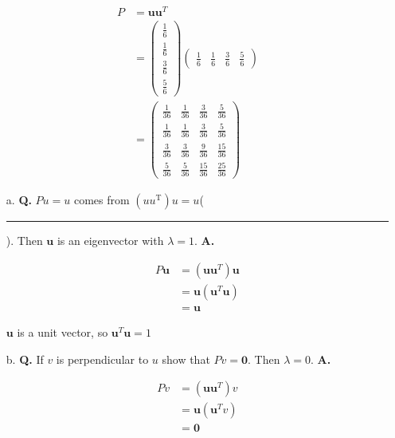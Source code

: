 \documentclass[main.tex]{subfiles}
\begin{document}
\begin{enumerate}
    $$
    \begin{aligned}
    P &=\mathbf{u u}^{T} \\
    &=\left(\begin{array}{llll}
    \frac{1}{6} \\
    \frac{1}{6} \\
    \frac{3}{6} \\
    \frac{5}{6}
    \end{array}\right)\left(\begin{array}{cccc}
    \frac{1}{6} & \frac{1}{6} & \frac{3}{6} & \frac{5}{6}
    \end{array}\right) \\
    &=\left(\begin{array}{llll}
    \frac{1}{36} & \frac{1}{36} & \frac{3}{36} & \frac{5}{36} \\
    \frac{1}{36} & \frac{1}{36} & \frac{3}{36} & \frac{5}{36} \\
    \frac{3}{36} & \frac{3}{36} & \frac{9}{36} & \frac{15}{36} \\
    \frac{5}{36} & \frac{5}{36} & \frac{15}{36} & \frac{25}{36}
    \end{array}\right)
    \end{aligned}
    $$
    
    \begin{enumerate}
        \item [a.] \textbf{Q.} $P u=u$ comes from $\left(u u^{\mathrm{T}}\right) u=u$( \rule{1cm}{0.15mm}). Then $\boldsymbol{u}$ is an eigenvector with $\lambda=1$. 
        \textbf{A.}

        $$
        \begin{aligned}
        P \mathbf{u} &=\left(\mathbf{u}\mathbf{u}^{T}\right) \mathbf{u} \\
        &=\mathbf{u}\left(\mathbf{u}^{T} \mathbf{u}\right) \\
        &=\mathbf{u}
        \end{aligned}
        $$

        $\mathbf{u}$ is a unit vector, so $\mathbf{u}^{T} \mathbf{u}=1$
        
        \item [b.] \textbf{Q.} If $v$ is perpendicular to $u$ show that $P v=\mathbf{0}$. Then $\lambda=0$. 
        \textbf{A.}

        $$
        \begin{aligned}
        P v &=\left(\mathbf{u}\mathbf{u}^{T}\right) v \\
        &=\mathbf{u}\left(\mathbf{u}^{T} v\right) \\
        &=\mathbf{0}
        \end{aligned}
        $$


\end{enumerate}
\end{enumerate}
\end{document}
